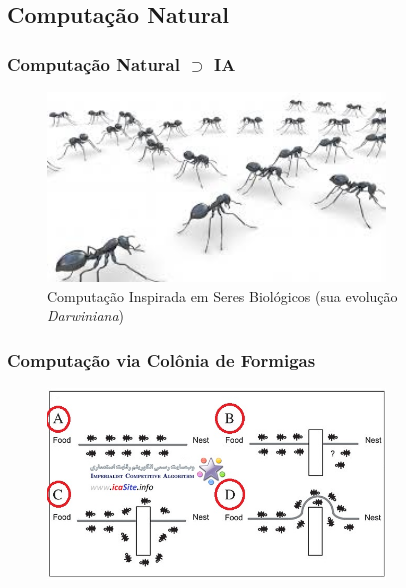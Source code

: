\documentclass{beamer}
\begin{document}
\subsection{Computação Natural}

\begin{frame}
\frametitle{Computação Natural $\supset $ IA}

\begin{figure}[ht!]
 \centering
 \includegraphics[width=0.8\textwidth , height=0.6\textheight]{figures/ant01.jpg}

\caption{Computação Inspirada em Seres Biológicos (sua evolução \textit{Darwiniana})} 
\end{figure}

\end{frame}

\begin{frame}
\frametitle{Computação via Colônia de Formigas}
\begin{figure}[ht!]
 \centering
 \includegraphics[width=0.8\textwidth , height=0.6\textheight]{figures/ant02.jpg}
\end{figure}
\end{frame}
\end{document}
